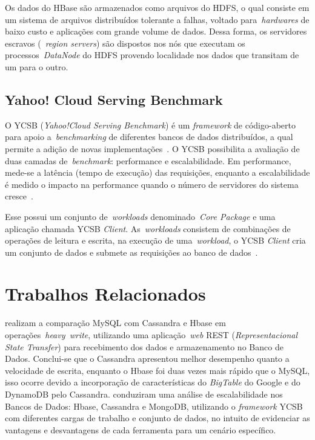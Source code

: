 \documentclass[12pt]{article}
\begin{document}
Os dados do HBase são armazenados como arquivos do HDFS, o qual consiste em um sistema de arquivos distribuídos tolerante a falhas, voltado para~\emph{hardwares} de baixo custo e aplicações com grande volume de dados. Dessa forma, os servidores escravos (~\emph{region servers}) são dispostos nos nós que executam os processos~\emph{DataNode} do HDFS provendo localidade nos dados que transitam de um para o outro.

\subsection{Yahoo! Cloud Serving Benchmark}
\label{subsec:ycsb}

O YCSB (\emph{Yahoo!Cloud Serving Benchmark}) é um \textit{framework} de código-aberto para apoio a~\emph{benchmarking} de diferentes bancos de dados distribuídos, a qual permite a adição de novas implementações~\cite{cooper2010benchmarking}. 
O YCSB possibilita a avaliação de duas camadas de~\textit{benchmark}: performance e escalabilidade. 
Em performance, mede-se a latência (tempo de execução) das requisições, enquanto a escalabilidade é medido o impacto na performance quando o número de servidores do sistema cresce~\cite{cooper2010benchmarking}.

Esse possui um conjunto de~\emph{workloads} denominado~\emph{Core Package} e uma aplicação chamada YCSB \textit{Client}. 
As~\emph{workloads} consistem de combinações de operações de leitura e escrita, na execução de uma~\emph{workload}, o YCSB \textit{Client} cria um conjunto de dados e submete as requisições ao banco de dados~\cite{cooper2010benchmarking}.

\section{Trabalhos Relacionados} 
\label{sec:relacionados}


\cite{jogi2016performance} realizam a comparação MySQL com Cassandra e Hbase em operações~\emph{heavy~\emph{write}}, utilizando uma aplicação~\emph{web} REST (\emph{Representacional State Transfer}) para recebimento dos dados e armazenamento no Banco de Dados. 
Conclui-se que o Cassandra apresentou melhor desempenho quanto a velocidade de escrita, enquanto o Hbase foi duas vezes mais rápido que o MySQL, isso ocorre devido a incorporação de características do \emph{BigTable} do Google e do DynamoDB pelo Cassandra. 
\cite{swaminathan2016quantitative} conduziram uma análise de escalabilidade nos Bancos de Dados: Hbase, Cassandra e MongoDB, utilizando o \textit{framework} YCSB com diferentes cargas de trabalho e conjunto de dados, no intuito de evidenciar as vantagens e desvantagens de cada ferramenta para um cenário específico.
\end{document}
